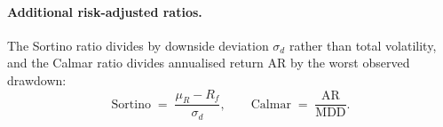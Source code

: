 \paragraph{Additional risk-adjusted ratios.} The Sortino ratio \parencite{sortino1991downside} divides by downside deviation $\sigma_d$ rather than total volatility, and the Calmar ratio divides annualised return $\mathrm{AR}$ by the worst observed drawdown:
\begin{equation}\label{eq:extraratios}
    \mathrm{Sortino} \;=\; \frac{\mu_R - R_f}{\sigma_d},
    \qquad
    \mathrm{Calmar} \;=\; \frac{\mathrm{AR}}{\mathrm{MDD}}.
\end{equation}

